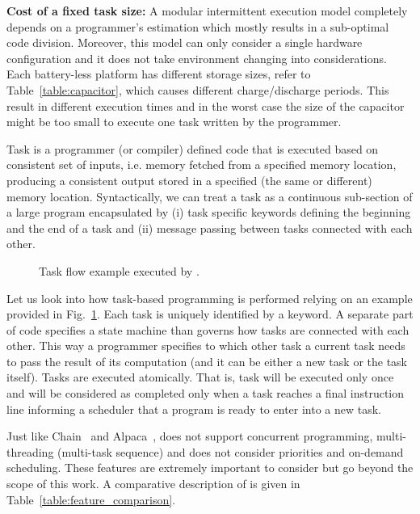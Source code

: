 \textbf{Cost of a fixed task size:} A modular intermittent execution model completely depends on a programmer's estimation which mostly results in a sub-optimal code division. Moreover, this model can only consider a single hardware configuration and it does not take environment changing into considerations. Each battery-less platform has different storage sizes, refer to Table~\ref{table:capacitor}, which causes different charge/discharge periods. This result in different execution times and in the worst case the size of the capacitor might be too small to execute one task written by the programmer.


Task is a programmer (or compiler) defined code that is executed based on consistent set of inputs, i.e. memory fetched from a specified memory location, producing a consistent output stored in a specified (the same or different) memory location. Syntactically, we can treat a task as a continuous sub-section of a large program encapsulated by (i) task specific keywords defining the beginning and the end of a task and (ii) message passing between tasks connected with each other.

\begin{figure}
	\centering
	\caption{Task flow example executed by \sys.}
	\label{fig:task_flow_example}
\end{figure}

Let us look into how task-based programming is performed relying on an example provided in Fig.~\ref{fig:task_flow_example}. Each task is uniquely identified by a keyword. A separate part of code specifies a state machine than governs how tasks are connected with each other. This way a programmer specifies to which other task a current task needs to pass the result of its computation (and it can be either a new task or the task itself). Tasks are executed atomically. That is, task will be executed only once and will be considered as completed only when a task reaches a final instruction line informing a scheduler that a program is ready to enter into a new task.

Just like Chain~\cite{chain} and Alpaca~\cite{alpaca}, \sys does not support concurrent programming, multi-threading (multi-task sequence) and does not consider priorities and on-demand scheduling. These features are extremely important to consider but go beyond the scope of this work. A comparative description of \sys is given in Table~\ref{table:feature_comparison}. 

